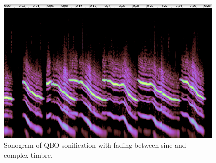 \documentclass[11pt,a4paper]{article}
\begin{document}
\begin{figure}
\centering
\includegraphics[width=\textwidth]{figures/blob-shaper-timbre4-161107.png}
\caption{Sonogram of QBO sonification with fading between sine and complex timbre.}
\label{fig:sono-shaper-timbre4}
\end{figure}

\end{document}
